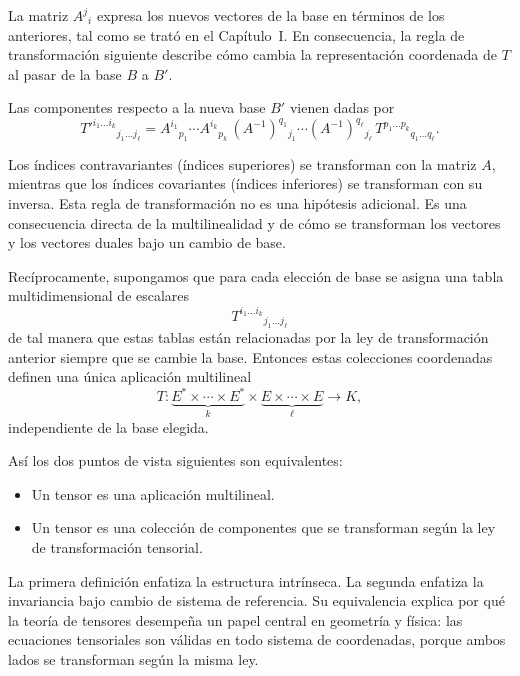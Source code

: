 La matriz $A^j{}_i$ expresa los nuevos vectores de la base en términos de los
anteriores, tal como se trató en el Capítulo~I.
En consecuencia, la regla de transformación siguiente describe cómo cambia la
representación coordenada de $T$ al pasar de la base $B$ a $B'$.

\medskip

Las componentes respecto a la nueva base $B'$ vienen dadas por
\[
T'^{i_1 \dots i_k}{}_{j_1 \dots j_\ell}
=
A^{i_1}{}_{p_1}
\cdots
A^{i_k}{}_{p_k}
\,
(A^{-1})^{q_1}{}_{j_1}
\cdots
(A^{-1})^{q_\ell}{}_{j_\ell}
\,
T^{p_1 \dots p_k}{}_{q_1 \dots q_\ell}.
\]

\medskip

Los índices contravariantes (índices superiores) se transforman con la matriz
$A$, mientras que los índices covariantes (índices inferiores) se transforman
con su inversa.
Esta regla de transformación no es una hipótesis adicional.
Es una consecuencia directa de la multilinealidad y de cómo se transforman
los vectores y los vectores duales bajo un cambio de base.

\medskip

Recíprocamente, supongamos que para cada elección de base se asigna una tabla
multidimensional de escalares
\[
T^{i_1 \dots i_k}{}_{j_1 \dots j_\ell}
\]
de tal manera que estas tablas están relacionadas por la ley de transformación
anterior siempre que se cambie la base.
Entonces estas colecciones coordenadas definen una única aplicación multilineal
\[
T :
\underbrace{E^* \times \cdots \times E^*}_{k}
\times
\underbrace{E \times \cdots \times E}_{\ell}
\longrightarrow K,
\]
independiente de la base elegida.

\medskip

Así los dos puntos de vista siguientes son equivalentes:
\begin{itemize}
\item Un tensor es una aplicación multilineal.
\item Un tensor es una colección de componentes que se transforman según la
      ley de transformación tensorial.
\end{itemize}

La primera definición enfatiza la estructura intrínseca.
La segunda enfatiza la invariancia bajo cambio de sistema de referencia.
Su equivalencia explica por qué la teoría de tensores desempeña un papel
central en geometría y física: las ecuaciones tensoriales son válidas en todo
sistema de coordenadas, porque ambos lados se transforman según la misma ley.


